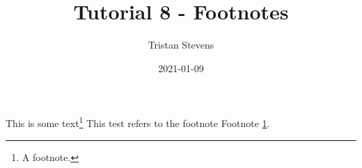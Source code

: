 \documentclass{article}
\title{Tutorial 8 - Footnotes}
\date{2021-01-09}
\author{Tristan Stevens}
\begin{document}
\maketitle
\newpage

This is some text\footnote{\label{myfootnote}A footnote.}
This test refers to the footnote Footnote \ref{myfootnote}.
\end{document}
